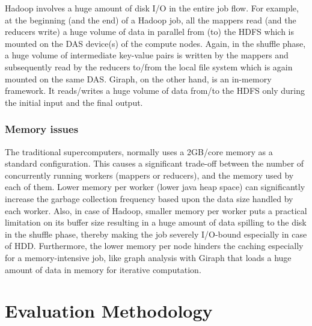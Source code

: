 \documentclass[conference]{IEEEtran}
\begin{document}
Hadoop involves a huge amount of disk I/O in the entire job flow. For example, at the beginning (and the end) of a Hadoop job, all the mappers read (and the reducers write) a huge volume of data in parallel from (to) the HDFS which is mounted on the DAS device(s) of the compute nodes. Again, in the shuffle phase, a huge volume of intermediate key-value pairs is written by the mappers and subsequently read by the reducers to/from the local file system which is again mounted on the same DAS. Giraph, on the other hand, is an in-memory framework. It reads/writes a huge volume of data from/to the HDFS only during the initial input and the final output.
\subsubsection {Memory issues}
The traditional supercomputers, normally uses a 2GB/core memory as a standard configuration. This causes a significant trade-off between the number of concurrently running workers (mappers or reducers), and the memory used by each of them. Lower memory per worker (lower java heap space) can significantly increase the garbage collection frequency based upon the data size handled by each worker. Also, in case of Hadoop, smaller memory per worker puts a practical limitation on its buffer size resulting in a huge amount of data spilling to the disk in the shuffle phase, thereby making the job severely I/O-bound especially in case of HDD. Furthermore, the lower memory per node hinders the caching especially for a memory-intensive job, like graph analysis with Giraph that loads a huge amount of data in memory for iterative computation.

\section {Evaluation Methodology} \label{EvaluationMethodology}
\end{document}

